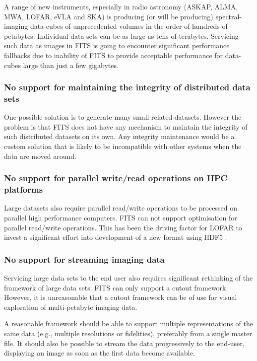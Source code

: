 \documentclass[final,authoryear,5p,times,twocolumn]{elsarticle}
\begin{document}
{{A range of new instruments, especially in radio astronomy (ASKAP,
ALMA, MWA, LOFAR, eVLA and SKA) is producing (or will be producing)
spectral-imaging data-cubes of unprecedented volumes in the order of
hundreds of petabytes. Individual data sets can be as large as tens of
terabytes.  Servicing such data as images in FITS is going to encounter
significant performance fallbacks due to inability of FITS to provide
acceptable performance for data-cubes large than just a few gigabytes.

\subsubsection{No support for maintaining the integrity of distributed data sets}

One possible solution is to generate many small related datasets. However
the problem is that FITS does not have any mechanism to maintain the
integrity of such distributed datasets on its own. Any integrity
maintenance would be a custom solution that is likely to be
incompatible with other systems when the data are moved around.

\subsubsection{No support for parallel write/read operations on HPC platforms}

Large datasets also require parallel read/write operations to be processed on parallel high performance
computers. FITS can not support optimisation for parallel read/write operations. This has been
the driving factor for LOFAR to invest a significant effort into development of a new format using
HDF5  \citep{2012ASPC..461..283A}.

\subsubsection{No support for streaming imaging data}

Servicing large data sets to the end user also requires significant
rethinking of the framework of large data sets. FITS can only support a
cutout framework.  However, it is unreasonable that a cutout framework
can be of use for visual exploration of multi-petabyte imaging data.

A reasonable framework should be able to support multiple representations
of the same data (e.g., multiple resolutions or fidelities), preferably
from a single master file. It should also be possible to stream the data
progressively to the end-user, displaying an image as soon
as the first data become available.

}}
\end{document}
